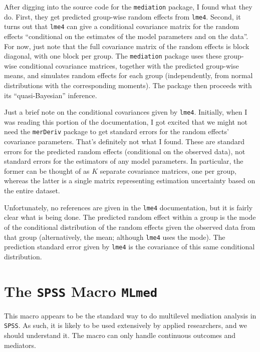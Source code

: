 \documentclass{article}
\begin{document}
After digging into the source code for the \texttt{mediation} package, I found what they do. First, they get predicted group-wise random effects from \texttt{lme4}. Second, it turns out that \texttt{lme4} can give a conditional covariance matrix for the random effects ``conditional on the estimates of the model parameters and on the data''. For now, just note that the full covariance matrix of the random effects is block diagonal, with one block per group. The \texttt{mediation} package uses these group-wise conditional covariance matrices, together with the predicted group-wise means, and simulates random effects for each group (independently, from normal distributions with the corresponding moments). The package then proceeds with its ``quasi-Bayesian'' inference. 

Just a brief note on the conditional covariances given by \texttt{lme4}. Initially, when I was reading this portion of the documentation, I got excited that we might not need the \texttt{merDeriv} package to get standard errors for the random effects' covariance parameters. That's definitely not what I found. These are standard errors for the predicted random effects (conditional on the observed data), not standard errors for the estimators of any model parameters. In particular, the former can be thought of as $K$ separate covariance matrices, one per group, whereas the latter is a single matrix representing estimation uncertainty based on the entire dataset. 

Unfortunately, no references are given in the \texttt{lme4} documentation, but it is fairly clear what is being done. The predicted random effect within a group is the mode of the conditional distribution of the random effects given the observed data from that group (alternatively, the mean; although \texttt{lme4} uses the mode). The prediction standard error given by \texttt{lme4} is the covariance of this same conditional distribution. 


\section{The \texttt{SPSS} Macro \texttt{MLmed}}
\label{sec:MLmed}

This macro appears to be the standard way to do multilevel mediation analysis in \texttt{SPSS}. As such, it is likely to be used extensively by applied researchers, and we should understand it. The macro can only handle continuous outcomes and mediators.

\subsection{\citet{Roc19}}
\end{document}

